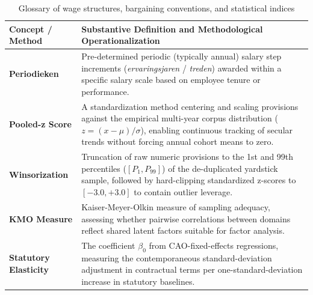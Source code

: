 \begin{table}[H]
    \centering
    \caption{Glossary of wage structures, bargaining conventions, and statistical indices}
    \label{tab:glossary_methodology}
    \small
    \begin{tabular}{lp{11.2cm}}
        \hline\hline
        Concept / Method & Substantive Definition and Methodological Operationalization \\
        \hline
        \textbf{Periodieken} & Pre-determined periodic (typically annual) salary step increments (\emph{ervaringsjaren} / \emph{treden}) awarded within a specific salary scale based on employee tenure or performance. \\
        \textbf{Pooled-z Score} & A standardization method centering and scaling provisions against the empirical multi-year corpus distribution ($z = (x - \mu)/\sigma$), enabling continuous tracking of secular trends without forcing annual cohort means to zero. \\
        \textbf{Winsorization} & Truncation of raw numeric provisions to the 1st and 99th percentiles ($[P_1, P_{99}]$) of the de-duplicated yardstick sample, followed by hard-clipping standardized z-scores to $[-3.0, +3.0]$ to contain outlier leverage. \\
        \textbf{KMO Measure} & Kaiser-Meyer-Olkin measure of sampling adequacy, assessing whether pairwise correlations between domains reflect shared latent factors suitable for factor analysis. \\
        \textbf{Statutory Elasticity} & The coefficient $\beta_0$ from CAO-fixed-effects regressions, measuring the contemporaneous standard-deviation adjustment in contractual terms per one-standard-deviation increase in statutory baselines. \\
        \hline\hline
    \end{tabular}
\end{table}

